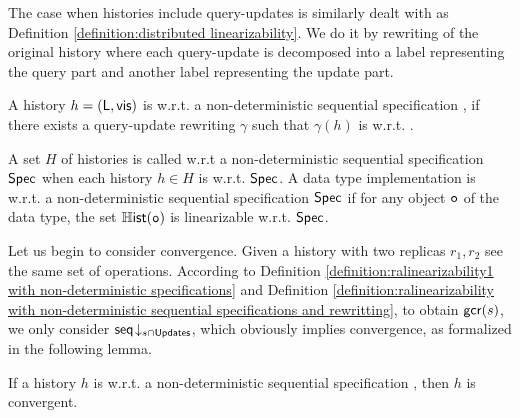 {%

The case when histories include query-updates is similarly dealt with as Definition \ref{definition:distributed linearizability}. We do it by rewriting of the original history where each query-update is decomposed into a label representing the query part and another label representing the update part.

\begin{definition}
\label{definition:ralinearizability with non-deterministic sequential specifications and rewritting}
A history $h =(\mathsf{L},\mathsf{vis})$ is \crdtlinearizable{} w.r.t. a non-deterministic sequential specification \Spec{}, if there exists a query-update rewriting $\gamma$ such that $\gamma(h)$ is \crdtlinearizable{} w.r.t. \Spec{}.
\end{definition}

A set $H$ of histories is called \crdtlinearizable{} w.r.t a non-deterministic sequential specification $\mathsf{Spec}$ when each history $h\in H$ is \crdtlinearizable{} w.r.t. $\mathsf{Spec}$. A data type implementation is \crdtlinearizable{} w.r.t. a non-deterministic sequential specification $\mathsf{Spec}$ if for any object $\mathtt{o}$ of the data type, the set $\mathbb{H}\mathsf{ist}(\mathtt{o})$ is linearizable w.r.t. $\mathsf{Spec}$.

Let us begin to consider convergence. Given a \crdtlinearizable{} history with two replicas $r_1,r_2$ see the same set of operations. According to Definition \ref{definition:ralinearizability1 with non-deterministic specifications} and Definition \ref{definition:ralinearizability with non-deterministic sequential specifications and rewritting}, to obtain $\mathsf{gcr}(s)$, we only consider $\mathsf{seq}\!\downarrow_{s\cap \mathsf{Updates}}$, which obviously implies convergence, as formalized in the following lemma.

\begin{lemma}
\label{lemma:distributed linarizability implies convergence for non-deterministic sequential specifications}
If a history $h$ is \crdtlinearizable{} w.r.t. a non-deterministic sequential specification \Spec, then $h$ is convergent.
\end{lemma}






}
